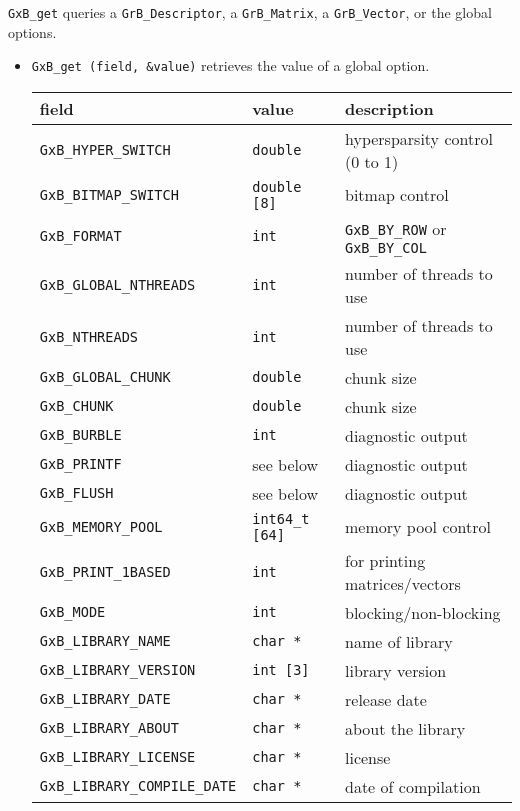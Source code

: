 \documentclass[12pt]{article}
\begin{document}
\verb'GxB_get' queries a \verb'GrB_Descriptor', a \verb'GrB_Matrix',
a \verb'GrB_Vector', or the global options.

\begin{itemize}

\item \verb'GxB_get (field, &value)' retrieves the value of a global option.

{\footnotesize
\begin{tabular}{lll}
field                       & value         & description \\
\hline
\verb'GxB_HYPER_SWITCH'     & \verb'double' & hypersparsity control (0 to 1) \\
\verb'GxB_BITMAP_SWITCH'    & \verb'double [8]' & bitmap control \\
\verb'GxB_FORMAT'           & \verb'int'    & \verb'GxB_BY_ROW' or \verb'GxB_BY_COL' \\
\verb'GxB_GLOBAL_NTHREADS'  & \verb'int'    & number of threads to use \\
\verb'GxB_NTHREADS'         & \verb'int'    & number of threads to use \\
\verb'GxB_GLOBAL_CHUNK'     & \verb'double' & chunk size \\
\verb'GxB_CHUNK'            & \verb'double' & chunk size \\
\verb'GxB_BURBLE'           & \verb'int'    & diagnostic output \\
\verb'GxB_PRINTF'           & see below     & diagnostic output \\
\verb'GxB_FLUSH'            & see below     & diagnostic output \\
\verb'GxB_MEMORY_POOL'      & \verb'int64_t [64]' & memory pool control \\
\verb'GxB_PRINT_1BASED'     & \verb'int'    & for printing matrices/vectors \\
\verb'GxB_MODE'                 & \verb'int'    & blocking/non-blocking \\
\verb'GxB_LIBRARY_NAME'         & \verb'char *' & name of library \\
\verb'GxB_LIBRARY_VERSION'      & \verb'int [3]' & library version \\
\verb'GxB_LIBRARY_DATE'         & \verb'char *' & release date \\
\verb'GxB_LIBRARY_ABOUT'        & \verb'char *' & about the library \\
\verb'GxB_LIBRARY_LICENSE'      & \verb'char *' & license \\
\verb'GxB_LIBRARY_COMPILE_DATE' & \verb'char *' & date of compilation \\

\end{tabular}}
\end{itemize}
\end{document}
